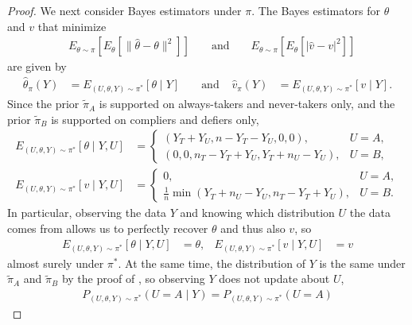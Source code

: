 \documentclass[12pt,reqno]{amsart}
\theoremstyle{theorem}
\theoremstyle{definition}
\newcommand{\0}{\mathbf{0}}
\newcommand{\1}{\mathbf{1}}
\begin{document}
\begin{proof}
    We next consider Bayes estimators under $\pi$.
    The Bayes estimators for $\theta$ and $v$ that minimize
    \begin{align*} 
        &E_{\theta \sim \pi}[ E_\theta [\| \hat{\theta} - \theta \|^2]]
        &
        &\text{ and }
        &
        &E_{\theta \sim \pi}[ E_\theta [| \hat{v} - v |^2 ]]
    \end{align*}
    are given by
    \begin{align*}
        \hat{\theta}_\pi(Y) &= E_{(U,\theta,Y) \sim \pi^*}[\theta \mid Y]
        &
        &\text{ and }
        &
        \hat{v}_\pi(Y) &= E_{(U,\theta,Y) \sim \pi^*}[v \mid Y].
    \end{align*}
    Since the prior $\tilde{\pi}_A$ is supported on always-takers and never-takers only, and the prior $\tilde{\pi}_B$ is supported on compliers and defiers only, 
    \begin{align*}
        E_{(U,\theta,Y) \sim \pi^*}[\theta \mid Y, U]
        &=
        \begin{cases}
            (Y_T + Y_U, n - Y_T - Y_U, 0, 0)
            , & U = A, \\
            (0,0,n_T - Y_T + Y_U, Y_T + n_U - Y_U)
            , & U = B,
        \end{cases}
        \\
        E_{(U,\theta,Y) \sim \pi^*}[v \mid Y, U]
        &=
        \begin{cases}
           0
            , & U = A, \\
            \tfrac{1}{n} \min(Y_T + n_U - Y_U, n_T - Y_T + Y_U)
            , & U = B.
        \end{cases}
    \end{align*}
    In particular,
    observing the data $Y$ and
    knowing which distribution $U$ the data comes from allows us to perfectly recover $\theta$ and thus also $v$,
    so
    \begin{align}
    \label{eqn:conditional-target}
        E_{(U,\theta,Y) \sim \pi^*}[\theta \mid Y, U]
        &= \theta,
        &
        E_{(U,\theta,Y) \sim \pi^*}[v \mid Y, U]
        &= v
    \end{align}
    almost surely under $\pi^*$.
    At the same time,
    the distribution of $Y$ is the same under $\tilde{\pi}_A$ and $\tilde{\pi}_B$ by the proof of , so observing $Y$ does not update about $U$,
    \begin{align*}
        P_{(U,\theta,Y) \sim \pi^*}(U = A \mid Y)
        = P_{(U,\theta,Y) \sim \pi^*}(U = A)

\end{align*}
\end{proof}
\end{document}
